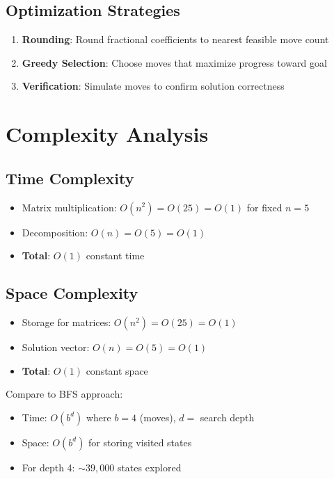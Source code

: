 \documentclass{article}
\begin{document}
\subsection{Optimization Strategies}

\begin{enumerate}
    \item \textbf{Rounding}: Round fractional coefficients to nearest feasible move count
    \item \textbf{Greedy Selection}: Choose moves that maximize progress toward goal
    \item \textbf{Verification}: Simulate moves to confirm solution correctness
\end{enumerate}

\section{Complexity Analysis}

\subsection{Time Complexity}

\begin{itemize}
    \item Matrix multiplication: $O(n^2) = O(25) = O(1)$ for fixed $n=5$
    \item Decomposition: $O(n) = O(5) = O(1)$
    \item \textbf{Total}: $O(1)$ constant time
\end{itemize}

\subsection{Space Complexity}

\begin{itemize}
    \item Storage for matrices: $O(n^2) = O(25) = O(1)$
    \item Solution vector: $O(n) = O(5) = O(1)$
    \item \textbf{Total}: $O(1)$ constant space
\end{itemize}

Compare to BFS approach:
\begin{itemize}
    \item Time: $O(b^d)$ where $b=4$ (moves), $d=$ search depth
    \item Space: $O(b^d)$ for storing visited states
    \item For depth 4: $\sim 39,000$ states explored
\end{itemize}
\end{document}
